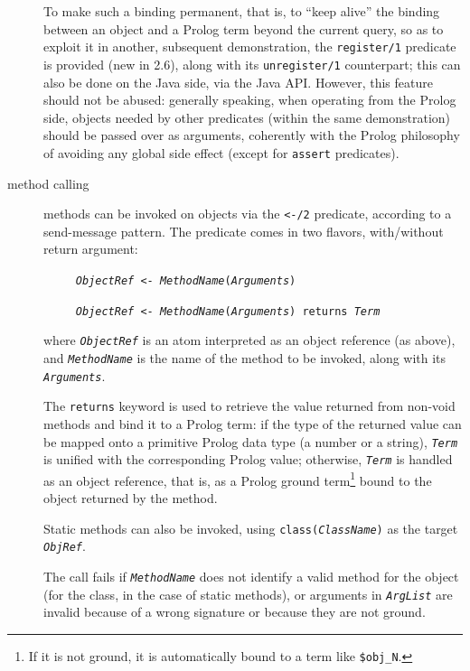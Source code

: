 \begin{description}
        To make such a binding permanent, that is, to ``keep alive'' the binding between an object and a Prolog term beyond the current query, so as to exploit it in another, subsequent demonstration, the \texttt{register/1} predicate is provided (new in \tuprolog{} 2.6), along with its \texttt{unregister/1} counterpart;
        this can also be done on the Java side, via the \tuprolog{} Java API.
        However, this feature should not be abused: generally speaking, when operating from the Prolog side, objects needed by other predicates (within the same demonstration) should be passed over as arguments, coherently with the Prolog philosophy of avoiding any global side effect (except for \texttt{assert} predicates).

  \item [method calling]
        methods can be invoked on objects via the \texttt{<-/2} predicate,
        according to a send-message pattern. The predicate comes in two flavors, with/without return argument:

        \texttt{~~~~~\textit{ObjectRef} <- \textit{MethodName}(\textit{Arguments})}

        \texttt{~~~~~\textit{ObjectRef} <- \textit{MethodName}(\textit{Arguments})
                returns \textit{Term}}

        where \texttt{\textit{ObjectRef}} is an atom interpreted as an object reference (as above), and \texttt{\textit{MethodName}} is the name of the method to be invoked, along with its \texttt{\textit{Arguments}}.

        The \texttt{returns} keyword is used to retrieve the value returned from non-void methods and bind it to a Prolog term: if the type of the returned value can be mapped onto a primitive Prolog data type (a number or a string), \texttt{\textit{Term}} is unified with the corresponding Prolog value; otherwise, \texttt{\textit{Term}} is handled as an object reference, that is, as a Prolog ground term\footnote{If it is not ground, it is automatically bound to a term like \texttt{\$obj\_N}.} bound to the object returned by the method.

        Static methods can also be invoked, using \texttt{class(\textit{ClassName})}
        as the target \texttt{\textit{ObjRef}}.

        The call fails if \texttt{\textit{MethodName}} does not identify a valid method for the object (for the class, in the case of static methods), or arguments in \texttt{\textit{ArgList}} are invalid because of a wrong signature or because they are not ground.


\end{description}
